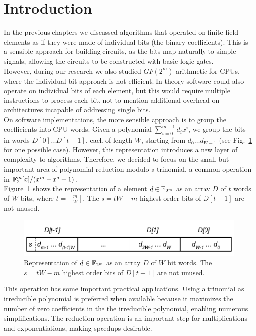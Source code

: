 \section{Introduction}

In the previous chapters we discussed algorithms that operated on finite field elements as if they were made of individual bits (the binary coefficients). This is a sensible approach for building circuits, as the bits map naturally to simple signals, allowing the circuits to be constructed with basic logic gates. \\

However, during our research we also studied $GF(2^m)$ arithmetic for CPUs, where the individual bit approach is not efficient. In theory software could also operate on individual bits of each element, but this would require multiple instructions to process each bit, not to mention additional overhead on architectures incapable of addressing single bits. \\

On software implementations, the more sensible approach is to group the coefficients into CPU words. Given a polynomial $\sum_{i=0}^{m-1} d_i x^i$, we group the bits in words $D[0] \ldots D[t-1]$, each of length $W$, starting from $d_0 \ldots d_{W-1}$ (see Fig.~\ref{fig:elemento:field} for one possible case). However, this representation introduces a new layer of complexity to algorithms. Therefore, we decided to focus on the small but important area of polynomial reduction modulo a trinomial, a common operation in $\mathbb{F}_2^m[x]/(x^m+x^a+1)$. \\

Figure~\ref{fig:elemento:field} shows the representation of a element $d \in {\mathbb F}_{2^m}$ as an array $D$ of $t$ words of $W$ bits, where $t = \left \lceil \frac{m}{W} \right \rceil$. The $s = tW-m$ highest order bits of $D[t-1]$ are not unused.
\begin{figure}[htb]
  \centering
  \includegraphics[width = .55\columnwidth]{figures/element-word.pdf}
\caption{Representation of $d \in {\mathbb F}_{2^m}$ as an array $D$ of $W$ bit words. The $s = tW-m$ highest order bits of $D[t-1]$ are not unused.}
\label{fig:elemento:field}
\end{figure}

This operation has some important practical applications. Using a trinomial as irreducible polynomial is preferred when available because it maximizes the number of zero coefficients in the the irreducible polynomial, enabling numerous simplifications. The reduction operation is an important step for multiplications and exponentiations, making speedups desirable.\\

